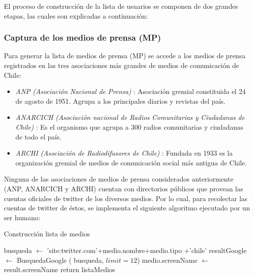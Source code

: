 El proceso de construcción de la lista de usuarios se componen de dos grandes etapas, las cuales son explicadas a continuación:



\subsubsection{Captura de los medios de prensa (MP)}

Para generar la lista de medios de prensa (MP) se accede a los medios de prensa registrados en las tres asociaciones más grandes de medios de comunicación de Chile:
\begin{itemize}
	\item \textit{ANP (Asociación Nacional de Prensa)} \cite{anpWebsite}: Asociación gremial constituida el 24 de agosto de 1951. Agrupa a los principales diarios y revistas del país.
	\item \textit{ANARCICH (Asociación nacional de Radios Comunitarias y Ciudadanas de Chile)} \cite{anarcichWebsite}: Es el organismo que agrupa a 300 radios comunitarias y ciudadanas de todo el país. 
	\item \textit{ARCHI (Asociación de Radiodifusores de Chile)} \cite{archiWebsite}: Fundada en 1933 es la organización gremial de medios de comunicación social más antigua de Chile.
\end{itemize}	

Ninguna de las asociaciones de medios de prensa considerados anteriormente (ANP, ANARCICH y ARCHI) cuentan con directorios públicos \cite{mediosArchi} \cite{mediosaAnp} \cite{mediosAnarcich} que provean las cuentas oficiales de twitter de los diversos medios. Por lo cual, para recolectar las cuentas de twitter de éstos, se implementa el siguiente algoritmo ejecutado por un ser humano:

\begin{algorithm}[H]
	\caption{Construcción lista de medios}\label{mediosPrensa}
	\begin{algorithmic}[1]
		\State busqueda $\gets$ 'site:twitter.com'+medio.nombre+medio.tipo +'chile'
		\State resultGoogle $\gets$ BusquedaGoogle ( busqueda, $limit=12$)
		\State medio.screenName $\gets$ result.screenName
		\EndIf 
		\EndFor
		\EndFor
		\State return listaMedios
		\EndFunction	
	\end{algorithmic}
\end{algorithm}

